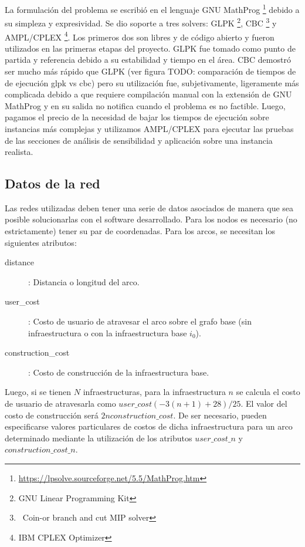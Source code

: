 \documentclass{article}
\begin{document}
  La formulación del problema se escribió en el lenguaje GNU MathProg \footnote{\url{https://lpsolve.sourceforge.net/5.5/MathProg.htm}} debido a su simpleza y expresividad. Se dio soporte a tres solvers: GLPK \footnote{GNU Linear Programming Kit}, CBC \footnote{\ Coin-or branch and cut MIP solver} y AMPL/CPLEX \footnote{IBM CPLEX Optimizer}. Los primeros dos son libres y de código abierto y fueron utilizados en las primeras etapas del proyecto. GLPK fue tomado como punto de partida y referencia debido a su estabilidad y tiempo en el área. CBC demostró ser mucho más rápido que GLPK (ver figura TODO: comparación de tiempos de de ejecución glpk vs cbc) pero su utilización fue, subjetivamente, ligeramente más complicada debido a que requiere compilación manual con la extensión de GNU MathProg y en su salida no notifica cuando el problema es no factible. Luego, pagamos el precio de la necesidad de bajar los tiempos de ejecución sobre instancias más complejas y utilizamos AMPL/CPLEX para ejecutar las pruebas de las secciones de análisis de sensibilidad y aplicación sobre una instancia realista.

  \subsection{Datos de la red}

  Las redes utilizadas deben tener una serie de datos asociados de manera que sea posible solucionarlas con el software desarrollado. Para los nodos es necesario (no estrictamente) tener su par de coordenadas. Para los arcos, se necesitan los siguientes atributos:

  \begin{description}
    \item[distance]: Distancia o longitud del arco.
    \item[user\_cost]: Costo de usuario de atravesar el arco sobre el grafo base (sin infraestructura o con la infraestructura base $i_0$).
    \item[construction\_cost]: Costo de construcción de la infraestructura base.
  \end{description}

  Luego, si se tienen $N$ infraestructuras, para la infraestructura $n$ se calcula el costo de usuario de atravesarla como $user\_cost (-3 (n + 1) + 28) / 25$. El valor del costo de construcción será $2 n construction\_cost$. De ser necesario, pueden especificarse valores particulares de costos de dicha infraestructura para un arco determinado mediante la utilización de los atributos $user\_cost\_n$ y $construction\_cost\_n$.
\end{document}
